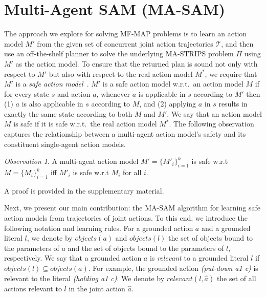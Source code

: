 \documentclass[letterpaper]{article} %
\theoremstyle{definition}
\theoremstyle{remark}
\newtheorem{observation}{Observation}
\newcommand{\objects}{\textit{objects}}
\newcommand{\relevant}{\textit{relevant}}
\newcommand{\realm}{\ensuremath{M^*}\xspace}
\newcommand{\masam}{\ac{MA-SAM}\xspace}
\newcommand{\mfmap}{\ac{MF-MAP}\xspace}
\begin{document}
\section{Multi-Agent SAM (MA-SAM)}
\label{sec:ma-sam}

The approach we explore for solving \mfmap problems is to learn
an action model $M'$ from the given set of concurrent joint action trajectories $\mathcal{T}$, and then use an off-the-shelf planner to solve the underlying MA-STRIPS problem $\Pi$ using $M'$ as the action model.
To ensure that the returned plan is sound not only with respect to $M'$ but also with respect to the real action model \realm, we require that $M'$ is a \emph{safe action model}~.
$M'$ is a safe action model w.r.t.\ an action model $M$ if for every state $s$ and action $a$, whenever $a$ is applicable in $s$ according to $M'$ then (1) $a$ is also applicable in $s$ according to $M$, and
(2) applying $a$ in $s$ results in exactly the same state according to both $M$ and $M'$.
We say that an action model $M$ is safe if it is safe w.r.t.\ the real action model $\realm$.
The following observation captures the relationship between a multi-agent action model's safety and its constituent single-agent action models.

\begin{observation}
A multi-agent action model $M'=\{M'_i\}_{i=1}^k$ is safe w.r.t $M=\{M_i\}_{i=1}^k$ iff $M'_i$ is safe w.r.t $M_i$ for all $i$.
\label{obs:safety-multi}
\end{observation}
\noindent A proof is provided in the supplementary material.


Next, we present our main contribution: the \masam algorithm for learning safe action models from trajectories of joint actions.
To this end, we introduce the following notation and learning rules.
For a grounded action $a$ and a grounded literal $l$, we denote by $\objects(a)$ and $\objects(l)$ the
set of objects bound to the parameters of $a$ and the set of objects bound to the parameters of $l$, respectively.
We say that a grounded action $a$ is \emph{relevant} to a grounded literal $l$ if $\objects(l)\subseteq\objects(a)$. For example, the grounded action \textit{(put-down a1 c)} is relevant to the literal \textit{(holding a1 c)}.
We denote by $\relevant(l,\hat{a})$ the set of all actions relevant to $l$ in the joint action $\hat{a}$.
\end{document}
